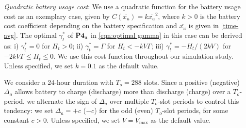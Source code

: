 \documentclass[journal]{IEEEtran}
\begin{document}
\emph{Quadratic battery usage cost}:
We use a quadratic function for the battery usage cost as an exemplary case, given by $C(\overline{x_u})=k\overline{x_u}^2$, where  $k>0$ is the battery cost coefficient depending on the battery specification and $\overline{x_u}$ is given in \eqref{time-avg}. The optimal $\gamma_t^*$  of $\text{\bf P4}_a$ in \eqref{eqn:optimal gamma} in this case can be derived as:
i) $\gamma^*_t= 0$ for $H_t> 0$; ii) $\gamma^*_t=\Gamma$ for $H_t< -kV\Gamma$; iii) $\gamma^*_t=-{H_t}/(2kV)$ for $-2kV\Gamma \le H_t \le 0$.
We use this cost function throughout our simulation study. Unless specified, we set $k=0.1$ as the default value.

We consider a 24-hour duration with  $T_o=288$ slots. Since a positive (negative)   $\Delta_a$ allows battery to charge (discharge) more than discharge (charge) over a $T_o$-period,  we alternate the sign of $\Delta_a$  over multiple $T_o$-slot periods to control this tendency:  we set $\Delta_a=+c$ ($-c$) for the odd (even) $T_o$-slot periods, for some constant $c>0$. Unless specified, we set $V=V_{\max}$ as the default value.
\end{document}
